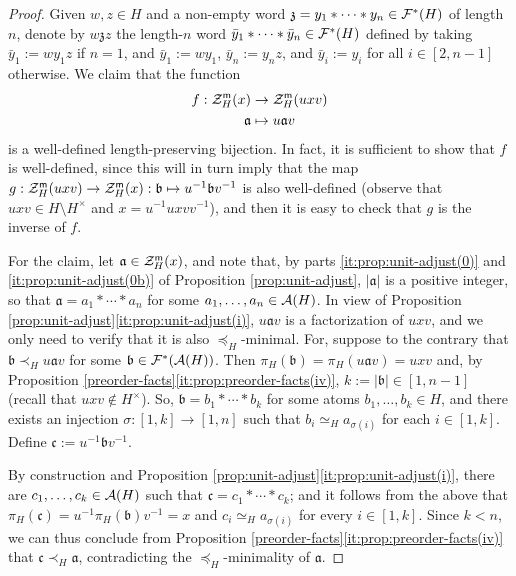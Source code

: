 \begin{proof}
	Given $w, z \in H$ and a non-empty word $\mathfrak{z} = y_1 \ast \cdots \ast y_n \in \mathcal{F}^\ast(H)$ of length $n$, denote by $w\mathfrak{z}z$ the length-$n$ word $\bar{y}_1 \ast \cdots \ast \bar{y}_n \in \mathcal{F}^\ast(H)$ defined by taking $\bar{y}_1 := w y_1 z$ if $n = 1$, and $\bar{y}_1:= wy_1$, $\bar{y}_n := y_nz$, and $\bar{y}_i := y_i$ for all $i\in [ 2,n-1]$ otherwise. 
	We claim that the function 
	\begin{align*}
	f: \mathcal{Z}_H^{\mathsf{m}}(x) &\to \mathcal{Z}_H^{\mathsf{m}}(uxv) \\
	\mathfrak a &\mapsto u\mathfrak a v
	\end{align*}
	is a well-defined length-preserving bijection. 
	In fact, it is sufficient to show that $f$ is well-defined, since this will in turn imply that the map $g: \mathcal{Z}_H^{\mathsf{m}}(uxv)\to\mathcal{Z}_H^{\mathsf{m}}(x):\mathfrak{b}\mapsto u^{-1}\mathfrak{b}v^{-1}$ is also well-defined (observe that $uxv \in H \setminus H^\times$ and $x = u^{-1} uxv v^{-1}$), and then it is easy to check that $g$ is the inverse of $f$.
	
	For the claim, let $\mathfrak a \in \mathcal{Z}_H^{\mathsf{m}}(x)$, and note that, by parts \ref{it:prop:unit-adjust(0)} and \ref{it:prop:unit-adjust(0b)} of Proposition \ref{prop:unit-adjust}, $|\mathfrak a|$ is a positive integer, so that  $\mathfrak a = a_1 \ast \cdots \ast a_n$ for some $a_1, \ldots, a_n \in \mathcal{A}(H)$. 
	In view of Proposition \ref{prop:unit-adjust}\ref{it:prop:unit-adjust(i)}, $u\mathfrak{a}v$ is a factorization of $uxv$, and we only need to verify that it is also $\preceq_H$-minimal. For,
suppose to the contrary that $\mathfrak b \prec_H u\mathfrak av$ for some $\mathfrak b \in \mathcal{F}^\ast(\mathcal{A}(H))$.
	Then $\pi_H(\mathfrak b) = \pi_H(u\mathfrak a v) = uxv$ and, by Proposition \ref{preorder-facts}\ref{it:prop:preorder-facts(iv)},
	$k := |\mathfrak b| \in [ 1, n-1 ]$
	(recall that $uxv \notin H^\times$). So, $\mathfrak b = b_1 \ast \cdots \ast b_k$ for some atoms  $b_1, \ldots, b_k \in H$, and there exists an injection $\sigma: [ 1, k ] \to [ 1, n ]$ such that $b_i \simeq_H a_{\sigma(i)}$ for each $i \in [ 1, k ]$.
	Define
	$
	\mathfrak{c} := u^{-1} \mathfrak b v^{-1}$. 
	
	By construction and Proposition \ref{prop:unit-adjust}\ref{it:prop:unit-adjust(i)}, there are  $c_1, \ldots, c_k \in \mathcal{A}(H)$ such that $\mathfrak c = c_1 \ast \cdots \ast c_k$; and it follows from the above that $\pi_H(\mathfrak c) = u^{-1} \pi_H(\mathfrak b) v^{-1} = x$ and $c_i \simeq_H a_{\sigma(i)}$ for every $i \in [ 1, k ]$. Since $k < n$, we can thus conclude from Proposition \ref{preorder-facts}\ref{it:prop:preorder-facts(iv)} that $\mathfrak c \prec_H \mathfrak a$, contradicting the $\preceq_H$-minimality of $\mathfrak{a}$.
\end{proof}
